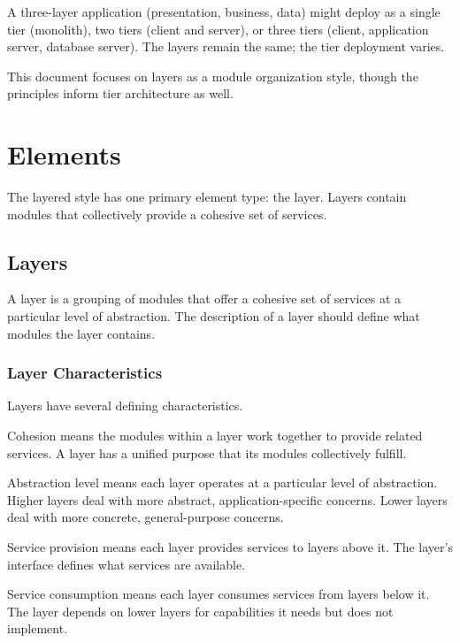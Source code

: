 \documentclass[11pt]{article}
\begin{document}
A three-layer application (presentation, business, data) might deploy as a single tier (monolith), two tiers (client and server), or three tiers (client, application server, database server). The layers remain the same; the tier deployment varies.

This document focuses on layers as a module organization style, though the principles inform tier architecture as well.

\section{Elements}

The layered style has one primary element type: the layer. Layers contain modules that collectively provide a cohesive set of services.

\subsection{Layers}

A layer is a grouping of modules that offer a cohesive set of services at a particular level of abstraction. The description of a layer should define what modules the layer contains.

\subsubsection{Layer Characteristics}

Layers have several defining characteristics.

Cohesion means the modules within a layer work together to provide related services. A layer has a unified purpose that its modules collectively fulfill.

Abstraction level means each layer operates at a particular level of abstraction. Higher layers deal with more abstract, application-specific concerns. Lower layers deal with more concrete, general-purpose concerns.

Service provision means each layer provides services to layers above it. The layer's interface defines what services are available.

Service consumption means each layer consumes services from layers below it. The layer depends on lower layers for capabilities it needs but does not implement.
\end{document}
